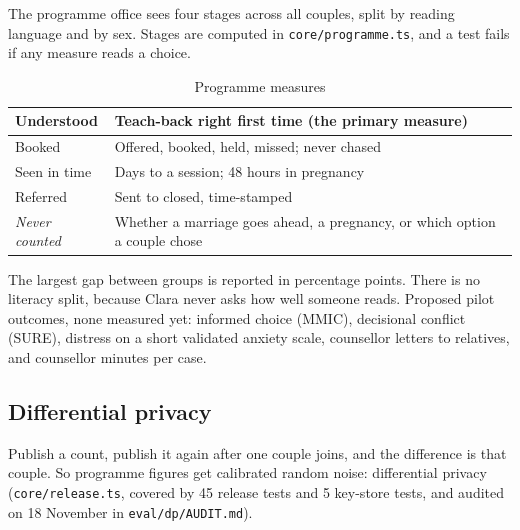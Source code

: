 \documentclass[10.5pt,a4paper]{article}
\newcommand{\toprl}{\arrayrulecolor{ink}\toprule\arrayrulecolor{rule}}
\newcommand{\file}[1]{\leavevmode\textcolor{muted}{\texttt{\small #1}}}
\begin{document}
The programme office sees four stages across all couples, split by reading language and by sex. Stages are computed in
\file{core/programme.ts}, and a test fails if any measure reads a choice.

{\small
\begin{xltabular}{\textwidth}{@{}P{3cm}L@{}}
\caption{Programme measures}\\
\toprl
Understood & Teach-back right first time (the primary measure)\\
\midrule
Booked & Offered, booked, held, missed; never chased\\
\midrule
Seen in time & Days to a session; 48 hours in pregnancy\\
\midrule
Referred & Sent to closed, time-stamped\\
\midrule
\textit{Never counted} & Whether a marriage goes ahead, a pregnancy, or which option a couple chose\\
\bottomrule
\end{xltabular}}

The largest gap between groups is reported in percentage points. There is no literacy split, because Clara never asks
how well someone reads. Proposed pilot outcomes, none measured yet: informed choice (MMIC), decisional conflict
(SURE), distress on a short validated anxiety scale, counsellor letters to relatives, and counsellor minutes per case.

\subsection{Differential privacy}

Publish a count, publish it again after one couple joins, and the difference is that couple. So programme figures get
calibrated random noise: differential privacy (\file{core/release.ts}, covered by 45 release tests and 5 key-store tests, and audited on 18 November in \file{eval/dp/AUDIT.md}).
\end{document}
